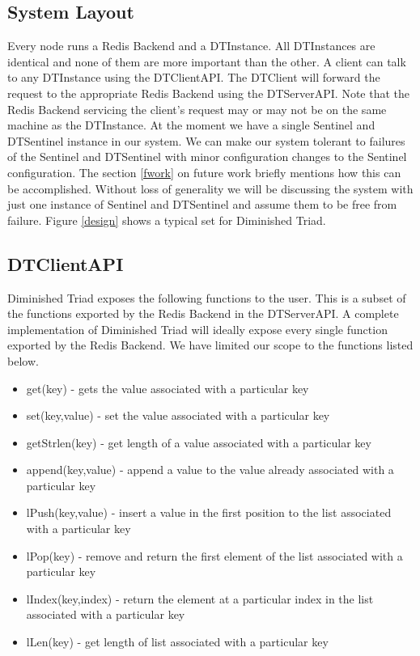 \documentclass[10pt,twocolumn,letterpaper]{article}
\begin{document}
\subsection{System Layout}
Every node runs a Redis Backend and a DTInstance. All DTInstances are identical and none of them are more important than the other. A client can talk to any DTInstance using the DTClientAPI. The DTClient will forward the request to the appropriate Redis Backend using the DTServerAPI. Note that the Redis Backend servicing the client's request may or may not be on the same machine as the DTInstance.
At the moment we have a single Sentinel and DTSentinel instance in our system. We can make our system tolerant to failures of the Sentinel and DTSentinel with minor configuration changes to the Sentinel configuration. The section \ref{fwork} on future work briefly mentions how this can be accomplished. Without loss of generality we will be discussing the system with just one instance of Sentinel and DTSentinel and assume them to be free from failure. Figure \ref{design} shows a typical set for Diminished Triad.

\subsection{DTClientAPI}
Diminished Triad exposes the following functions to the user. This is a subset of the functions exported by the Redis Backend in the DTServerAPI. A complete implementation of Diminished Triad will ideally expose every single function exported by the Redis Backend. We have limited our scope to the functions listed below.
\begin{itemize}
  \item get(key) - gets the value associated with a particular key
  \item set(key,value) - set the value associated with a particular key
  \item getStrlen(key) - get length of a value associated with a particular key
  \item append(key,value) - append a value to the value already associated with a particular key
  \item lPush(key,value) - insert a value in the first position to the list associated with a particular key
  \item lPop(key) - remove and return the first element of the list associated with a particular key
  \item lIndex(key,index) - return the element at a particular index in the list associated with a particular key
  \item lLen(key) - get length of list associated with a particular key
\end{itemize}
\end{document}
